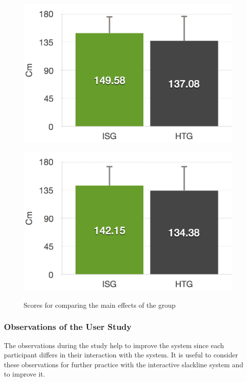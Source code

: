 \begin{figure}[htb]
\begin{minipage}[t]{0.40\linewidth}
		\includegraphics[width=1\linewidth]{Pictures/6_4_DIA_DistanceLeftGroupEffect}
		\label{fig:6_4_distanceLeftGroupEffect}
	\end{minipage}
	\hfill
	\begin{minipage}[t]{0.40\linewidth}
		\centering
		\includegraphics[width=1\linewidth]{Pictures/6_4_DIA_DistanceRightGroupEffect}
		\label{fig:6_4_distanceRightGroupEffect}
	\end{minipage}
	\caption{Scores for comparing the main effects of the group}
	\label{fig:6_4_mainEffectGroup}
\end{figure}

\subsubsection{Observations of the User Study}\label{6_4_slacklineObservations}
The observations during the study help to improve the system since each participant differs in their interaction with the system.
It is useful to consider these observations for further practice with the interactive slackline system and to improve it.

